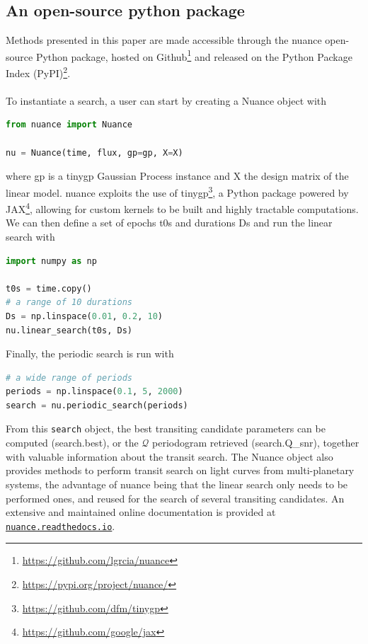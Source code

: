 \documentclass{aastex631}
\newcommand{\footlink}[1]{\footnote{\url{#1}}}
\begin{document}
\subsection{An open-source python package}
Methods presented in this paper are made accessible through the \textsf{nuance} open-source Python package, hosted on Github\footnote{\href{https://github.com/lgrcia/nuance}{https://github.com/lgrcia/nuance}} and released on the Python Package Index (PyPI)\footlink{https://pypi.org/project/nuance/}. 
\\\\
To instantiate a search, a user can start by creating a \textsf{Nuance} object with
\begin{lstlisting}[language=Python]
from nuance import Nuance

nu = Nuance(time, flux, gp=gp, X=X)
\end{lstlisting}
where \textsf{gp} is a \textsf{tinygp} Gaussian Process instance and \textsf{X} the design matrix of the linear model. \textsf{nuance} exploits the use of \textsf{tinygp}\footnote{\href{https://github.com/dfm/tinygp}{https://github.com/dfm/tinygp}}, a Python package powered by \textsf{JAX}\footnote{\href{https://github.com/google/jax}{https://github.com/google/jax}}, allowing for custom kernels to be built and highly tractable computations. We can then define a set of epochs \textsf{t0s} and durations \textsf{Ds} and run the linear search with
\begin{lstlisting}[language=Python,linewidth=\linewidth]
import numpy as np

t0s = time.copy()
# a range of 10 durations
Ds = np.linspace(0.01, 0.2, 10)
nu.linear_search(t0s, Ds)
\end{lstlisting}
Finally, the periodic search is run with
\begin{lstlisting}[language=Python]
# a wide range of periods
periods = np.linspace(0.1, 5, 2000)
search = nu.periodic_search(periods)
\end{lstlisting}
From this \texttt{search} object, the best transiting candidate parameters can be computed (\textsf{search.best}), or the $\mathcal{Q}$ periodogram retrieved (\textsf{search.Q\_snr}), together with valuable information about the transit search. The \textsf{Nuance} object also provides methods to perform transit search on light curves from multi-planetary systems, the advantage of \textsf{nuance} being that the linear search only needs to be performed ones, and reused for the search of several transiting candidates. An extensive and maintained online documentation is provided at \href{https://nuance.readthedocs.io}{\texttt{nuance.readthedocs.io}}.
\end{document}
